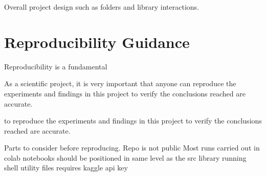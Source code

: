 Overall project design such as folders and library interactions.


\section{Reproducibility Guidance} \label{sec:reproducibility}
Reproducibility is a fundamental 

As a scientific project, it is very important that anyone can reproduce the experiments and findings in this project to verify the conclusions reached are accurate. \cite{dataset}


to reproduce the experiments and findings in this project to verify the conclusions reached are accurate.

Parts to consider before reproducing.
Repo is not public
Most runs carried out in colab 
notebooks should be positioned in same level as the src library
running shell utility files requires kaggle api key


\clearpage